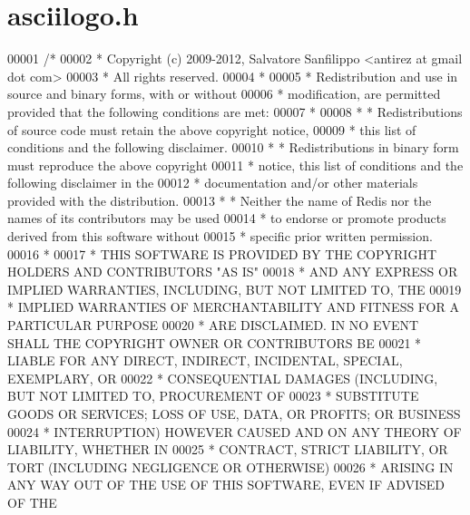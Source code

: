 \hypertarget{asciilogo_8h_source}{}\section{asciilogo.\+h}
\label{asciilogo_8h_source}

\begin{DoxyCode}
00001 \textcolor{comment}{/*}
00002 \textcolor{comment}{ * Copyright (c) 2009-2012, Salvatore Sanfilippo <antirez at gmail dot com>}
00003 \textcolor{comment}{ * All rights reserved.}
00004 \textcolor{comment}{ *}
00005 \textcolor{comment}{ * Redistribution and use in source and binary forms, with or without}
00006 \textcolor{comment}{ * modification, are permitted provided that the following conditions are met:}
00007 \textcolor{comment}{ *}
00008 \textcolor{comment}{ *   * Redistributions of source code must retain the above copyright notice,}
00009 \textcolor{comment}{ *     this list of conditions and the following disclaimer.}
00010 \textcolor{comment}{ *   * Redistributions in binary form must reproduce the above copyright}
00011 \textcolor{comment}{ *     notice, this list of conditions and the following disclaimer in the}
00012 \textcolor{comment}{ *     documentation and/or other materials provided with the distribution.}
00013 \textcolor{comment}{ *   * Neither the name of Redis nor the names of its contributors may be used}
00014 \textcolor{comment}{ *     to endorse or promote products derived from this software without}
00015 \textcolor{comment}{ *     specific prior written permission.}
00016 \textcolor{comment}{ *}
00017 \textcolor{comment}{ * THIS SOFTWARE IS PROVIDED BY THE COPYRIGHT HOLDERS AND CONTRIBUTORS "AS IS"}
00018 \textcolor{comment}{ * AND ANY EXPRESS OR IMPLIED WARRANTIES, INCLUDING, BUT NOT LIMITED TO, THE}
00019 \textcolor{comment}{ * IMPLIED WARRANTIES OF MERCHANTABILITY AND FITNESS FOR A PARTICULAR PURPOSE}
00020 \textcolor{comment}{ * ARE DISCLAIMED. IN NO EVENT SHALL THE COPYRIGHT OWNER OR CONTRIBUTORS BE}
00021 \textcolor{comment}{ * LIABLE FOR ANY DIRECT, INDIRECT, INCIDENTAL, SPECIAL, EXEMPLARY, OR}
00022 \textcolor{comment}{ * CONSEQUENTIAL DAMAGES (INCLUDING, BUT NOT LIMITED TO, PROCUREMENT OF}
00023 \textcolor{comment}{ * SUBSTITUTE GOODS OR SERVICES; LOSS OF USE, DATA, OR PROFITS; OR BUSINESS}
00024 \textcolor{comment}{ * INTERRUPTION) HOWEVER CAUSED AND ON ANY THEORY OF LIABILITY, WHETHER IN}
00025 \textcolor{comment}{ * CONTRACT, STRICT LIABILITY, OR TORT (INCLUDING NEGLIGENCE OR OTHERWISE)}
00026 \textcolor{comment}{ * ARISING IN ANY WAY OUT OF THE USE OF THIS SOFTWARE, EVEN IF ADVISED OF THE}

\end{DoxyCode}

